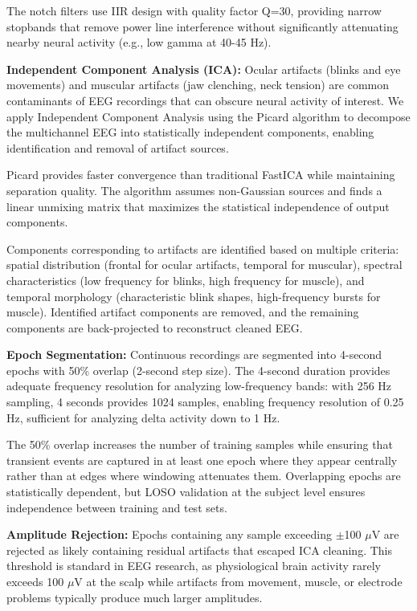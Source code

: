 \documentclass[blue,fullpaper]{ludusofficial}  %
\begin{document}
The notch filters use IIR design with quality factor Q=30, providing narrow stopbands that remove power line interference without significantly attenuating nearby neural activity (e.g., low gamma at 40-45 Hz).

\textbf{Independent Component Analysis (ICA):} Ocular artifacts (blinks and eye movements) and muscular artifacts (jaw clenching, neck tension) are common contaminants of EEG recordings that can obscure neural activity of interest. We apply Independent Component Analysis using the Picard algorithm to decompose the multichannel EEG into statistically independent components, enabling identification and removal of artifact sources.

Picard provides faster convergence than traditional FastICA while maintaining separation quality. The algorithm assumes non-Gaussian sources and finds a linear unmixing matrix that maximizes the statistical independence of output components.

Components corresponding to artifacts are identified based on multiple criteria: spatial distribution (frontal for ocular artifacts, temporal for muscular), spectral characteristics (low frequency for blinks, high frequency for muscle), and temporal morphology (characteristic blink shapes, high-frequency bursts for muscle). Identified artifact components are removed, and the remaining components are back-projected to reconstruct cleaned EEG.

\textbf{Epoch Segmentation:} Continuous recordings are segmented into 4-second epochs with 50\% overlap (2-second step size). The 4-second duration provides adequate frequency resolution for analyzing low-frequency bands: with 256 Hz sampling, 4 seconds provides 1024 samples, enabling frequency resolution of 0.25 Hz, sufficient for analyzing delta activity down to 1 Hz.

The 50\% overlap increases the number of training samples while ensuring that transient events are captured in at least one epoch where they appear centrally rather than at edges where windowing attenuates them. Overlapping epochs are statistically dependent, but LOSO validation at the subject level ensures independence between training and test sets.

\textbf{Amplitude Rejection:} Epochs containing any sample exceeding $\pm$100 $\mu$V are rejected as likely containing residual artifacts that escaped ICA cleaning. This threshold is standard in EEG research, as physiological brain activity rarely exceeds 100 $\mu$V at the scalp while artifacts from movement, muscle, or electrode problems typically produce much larger amplitudes.
\end{document}
